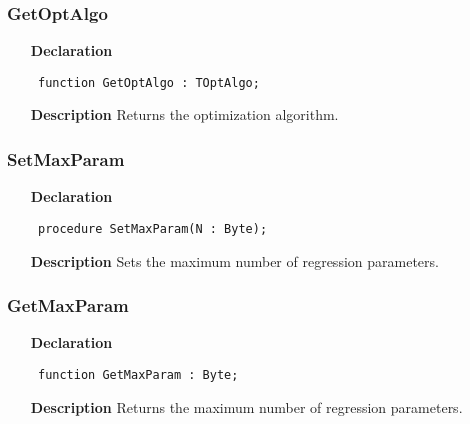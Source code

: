 \documentclass[12pt,a4paper,oneside]{report}
\newcommand{\declarationitem}[1]{\textbf{#1}}
\newcommand{\descriptiontitle}[1]{\textbf{#1}}
\newcommand{\code}[1]{\texttt{#1}}
\begin{document}
\subsubsection{GetOptAlgo}
\label{unlfit-GetOptAlgo}
\begin{itemize}\item[\declarationitem{Declaration}\hfill]
	\begin{flushleft}
		\code{
			function GetOptAlgo : TOptAlgo;}
		
	\end{flushleft}
	
	\par
	\item[\descriptiontitle{Description}]
	Returns the optimization algorithm.
	
\end{itemize}
\subsubsection{SetMaxParam}
\label{unlfit-SetMaxParam}
\begin{itemize}\item[\declarationitem{Declaration}\hfill]
	\begin{flushleft}
		\code{
			procedure SetMaxParam(N : Byte);}
		
	\end{flushleft}
	
	\par
	\item[\descriptiontitle{Description}]
	Sets the maximum number of regression parameters.
	
\end{itemize}
\subsubsection{GetMaxParam}
\label{unlfit-GetMaxParam}
\begin{itemize}\item[\declarationitem{Declaration}\hfill]
	\begin{flushleft}
		\code{
			function GetMaxParam : Byte;}
		
	\end{flushleft}
	
	\par
	\item[\descriptiontitle{Description}]
	Returns the maximum number of regression parameters.
	
\end{itemize}
\end{document}
